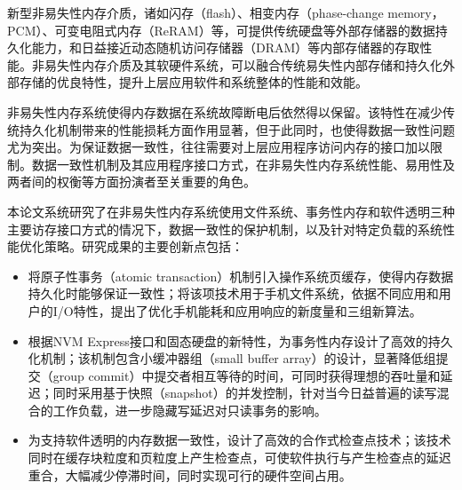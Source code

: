\begin{cabstract}
    新型非易失性内存介质，诸如闪存（flash）、相变内存（phase-change
memory，PCM）、可变电阻式内存（ReRAM）等，可提供传统硬盘等外部存储器的数据持久化能力，和日益接近动态随机访问存储器（DRAM）等内部存储器的存取性能。非易失性内存介质及其软硬件系统，可以融合传统易失性内部存储和持久化外部存储的优良特性，提升上层应用软件和系统整体的性能和效能。

    非易失性内存系统使得内存数据在系统故障断电后依然得以保留。该特性在减少传统持久化机制带来的性能损耗方面作用显著，但于此同时，也使得数据一致性问题尤为突出。为保证数据一致性，往往需要对上层应用程序访问内存的接口加以限制。数据一致性机制及其应用程序接口方式，在非易失性内存系统性能、易用性及两者间的权衡等方面扮演者至关重要的角色。

    本论文系统研究了在非易失性内存系统使用文件系统、事务性内存和软件透明三种主要访存接口方式的情况下，数据一致性的保护机制，以及针对特定负载的系统性能优化策略。研究成果的主要创新点包括：

  \begin{itemize}
    \item 将原子性事务（atomic transaction）机制引入操作系统页缓存，使得内存数据持久化时能够保证一致性；将该项技术用于手机文件系统，依据不同应用和用户的I/O特性，提出了优化手机能耗和应用响应的新度量和三组新算法。
    \item 根据NVM Express接口和固态硬盘的新特性，为事务性内存设计了高效的持久化机制；该机制包含小缓冲器组（small buffer array）的设计，显著降低组提交（group commit）中提交者相互等待的时间，可同时获得理想的吞吐量和延迟；同时采用基于快照（snapshot）的并发控制，针对当今日益普遍的读写混合的工作负载，进一步隐藏写延迟对只读事务的影响。
    \item 为支持软件透明的内存数据一致性，设计了高效的合作式检查点技术；该技术同时在缓存块粒度和页粒度上产生检查点，可使软件执行与产生检查点的延迟重合，大幅减少停滞时间，同时实现可行的硬件空间占用。
  \end{itemize}

\end{cabstract}


